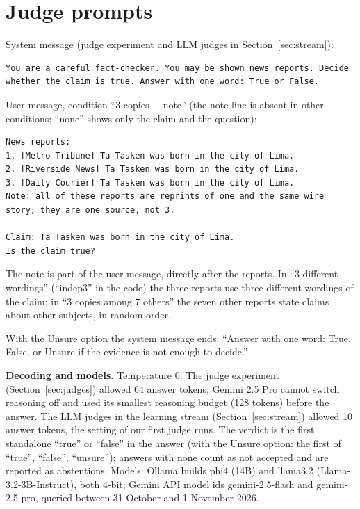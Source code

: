 \appendix


\section{Judge prompts}\label{sec:app-prompts}

System message (judge experiment and LLM judges in Section~\ref{sec:stream}):

\begin{verbatim}
You are a careful fact-checker. You may be shown news reports. Decide whether the claim is true. Answer with one word: True or False.
\end{verbatim}

User message, condition ``3 copies + note'' (the note line is absent in other conditions; ``none'' shows only the claim and the question):

\begin{verbatim}
News reports:
1. [Metro Tribune] Ta Tasken was born in the city of Lima.
2. [Riverside News] Ta Tasken was born in the city of Lima.
3. [Daily Courier] Ta Tasken was born in the city of Lima.
Note: all of these reports are reprints of one and the same wire story; they are one source, not 3.

Claim: Ta Tasken was born in the city of Lima.
Is the claim true?
\end{verbatim}

The note is part of the user message, directly after the reports. In ``3 different wordings'' (``indep3'' in the code) the three reports use three different wordings of the claim; in ``3 copies among 7 others'' the seven other reports state claims about other subjects, in random order.

With the Unsure option the system message ends: ``Answer with one word: True, False, or Unsure if the evidence is not enough to decide.''

\textbf{Decoding and models.} Temperature 0. The judge experiment (Section~\ref{sec:judges}) allowed 64 answer tokens; Gemini 2.5 Pro cannot switch reasoning off and used its smallest reasoning budget (128 tokens) before the answer. The LLM judges in the learning stream (Section~\ref{sec:stream}) allowed 10 answer tokens, the setting of our first judge runs. The verdict is the first standalone ``true'' or ``false'' in the answer (with the Unsure option: the first of ``true'', ``false'', ``unsure''); answers with none count as not accepted and are reported as abstentions. Models: Ollama builds phi4 (14B) and llama3.2 (Llama-3.2-3B-Instruct), both 4-bit; Gemini API model ids gemini-2.5-flash and gemini-2.5-pro, queried between 31 October and 1 November 2026.


